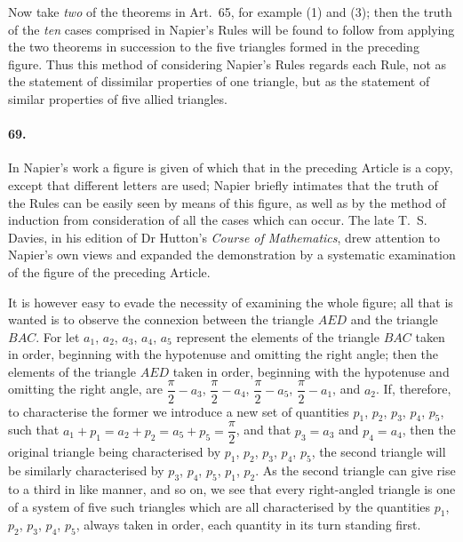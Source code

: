 \documentclass{book}[2004/02/16]
\begin{document}
\begin{mainmatter}
\begin{spacing}{1.3}
Now take \textit{two} of the theorems in Art.~65, for example (1) and
(3); then the truth of the \textit{ten} cases comprised in Napier's Rules
will be found to follow from applying the two theorems in succession
to the five triangles formed in the preceding figure. Thus
this method of considering Napier's Rules regards each Rule, not
as the statement of dissimilar properties of one triangle, but as the
statement of similar properties of five allied triangles.

\paragraph{69.} In Napier's work a figure is given of which that in the
preceding Article is a copy, except that different letters are used;
Napier briefly intimates that the truth of the Rules can be easily
seen by means of this figure, as well as by the method of induction
from consideration of all the cases which can occur. The late
T.~S. Davies, in his edition of Dr Hutton's \textit{Course of Mathematics},
drew attention to Napier's own views and expanded the demonstration
by a systematic examination of the figure of the preceding
Article.

It is however easy to evade the necessity of examining the
whole figure; all that is wanted is to observe the connexion
between the triangle $AED$ and the triangle $BAC$. For let $a_1$, $a_2$,
$a_3$, $a_4$, $a_5$ represent the elements of the triangle $BAC$ taken in
order, beginning with the hypotenuse and omitting the right
angle; then the elements of the triangle $AED$ taken in order,
beginning with the hypotenuse and omitting the right angle, are
$\dfrac{\pi}{2} - a_3$, $\dfrac{\pi}{2} - a_4$, $\dfrac{\pi}{2} - a_5$,
$\dfrac{\pi}{2} - a_1$, and $a_2$. If, therefore, to characterise
the former we introduce a new set of quantities $p_1$, $p_2$, $p_3$, $p_4$, $p_5$,
such that $a_1 + p_1 = a_2 + p_2 = a_5 + p_5 = \dfrac{\pi}{2}$, and that $p_3 = a_3$ and $p_4 = a_4$,
then the original triangle being characterised by $p_1$, $p_2$, $p_3$, $p_4$, $p_5$,
the second triangle will be similarly characterised by $p_3$, $p_4$, $p_5$,
$p_1$, $p_2$. As the second triangle can give rise to a third in like
manner, and so on, we see that every right-angled triangle is one
of a system of five such triangles which are all characterised by
the quantities $p_1$, $p_2$, $p_3$, $p_4$, $p_5$, always taken in order, each
quantity in its turn standing first.


\end{spacing}
\end{mainmatter}
\end{document}
